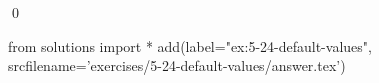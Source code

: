 
\begin{ex}
  \label{ex:5-24-default-values}
  
  \qed
\end{ex}
\begin{python0}
from solutions import *
add(label="ex:5-24-default-values",
    srcfilename='exercises/5-24-default-values/answer.tex')
\end{python0}
